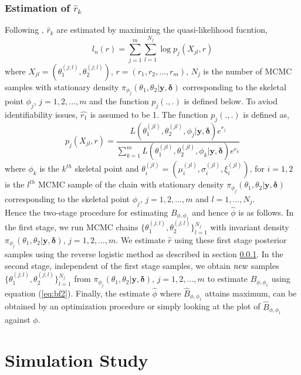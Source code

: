 \documentclass[11pt]{article}
\theoremstyle{remboldstyle}
\newcommand{\y}{{\boldsymbol{y}}}
\newcommand{\de}{{\boldsymbol{\delta}}}
\begin{document}
\subsubsection{Estimation of \textbf{$\hat{r}_k$}}
\label{sec:revlog}
\noindent
Following \cite{geyer:1994}, $\hat{r}_k$ are estimated by maximizing the quasi-likelihood fucntion,
\begin{equation}
l_n(r) = \sum\limits_{j = 1}^m\sum\limits_{l = 1}^{N_j} \log p_j(X_{jl},r)
\end{equation}
where $X_{jl} = (\theta_1^{(j;l)}, \theta_2^{(j;l)})$, $r = (r_1, r_2, \dots, r_m)$, $N_j$ is the number of MCMC samples with stationary density $\pi_{\phi_j}(\theta_1, \theta_2| \y, \de)$ corresponding to the skeletal point $\phi_j$, $j = 1, 2,..., m$ and the function $p_j(.,.)$ is defined below. To aviod identifiability issues, $\hat{r_1}$ is assumed to be 1. The function $p_j(.,.)$ is defined as,
\begin{equation}
p_j(X_{jl}, r) = \frac{L(\theta_1^{(jl)}, \theta_2^{(jl)}, \phi_j| \y, \de)e^{r_j}}{\sum\limits_{k = 1}^m L(\theta_1^{(jl)}, \theta_2^{(jl)}, \phi_k| \y, \de)e^{r_k}}
\end{equation}
where $\phi_k$ is the $k^{th}$ skeletal point and $\theta_i^{(jl)} = (\mu_i^{(jl)}, \sigma_i^{(jl)}, \xi_i^{(jl)})$, for $i = 1, 2$ is the $l^{th}$ MCMC sample of the chain with stationary density $\pi_{\phi_j}(\theta_1, \theta_2| \y, \de)$ corresponding to the skeletal point $\phi_j$, $j = 1, 2,..., m$ and $l = 1,...,N_j$.\\
Hence the two-stage procedure for estimating $B_{\phi, \phi_1}$ and hence $\hat{\phi}$ is as follows. In the first stage, we run MCMC chains $\{\theta_1^{(j;l)}, \theta_2^{(j;l)}\}_{l=1}^{N_j}$ with invariant density $\pi_{\phi_j}(\theta_1, \theta_2| \y, \de)$, $j = 1, 2, ... , m$. We estimate $\hat{r}$ using these first stage posterior samples using the reverse logistic method as described in section \ref{sec:revlog}. In the second stage, independent of the first stage samples, we obtain $\it{new}$ samples $\{\theta_1^{(j;l)}, \theta_2^{(j;l)}\}_{l=1}^{N_j}$ from $\pi_{\phi_j}(\theta_1, \theta_2| \y, \de)$, $j = 1, 2, ... , m$ to estimate $B_{\phi, \phi_1}$ using equation (\ref{eq:bf2}). Finally, the estimate $\hat{\phi}$ where $\hat{B}_{\phi, \phi_1}$ attains maximum, can be obtained by an optimization procedure or simply looking at the plot of $\hat{B}_{\phi, \phi_1}$ against $\phi$.
\section{Simulation Study}
\label{sec:sim}
\end{document}
